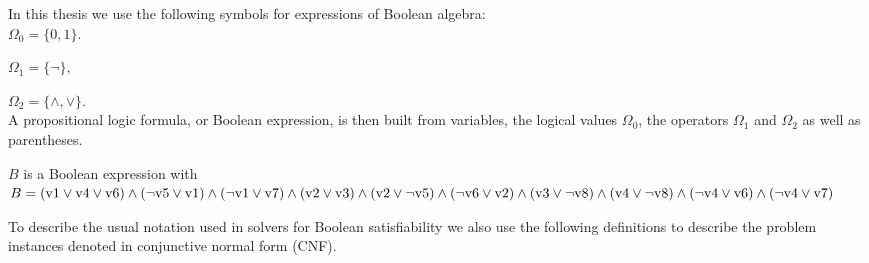\documentclass[a4paper, 12pt, bibliography=totoc]{scrartcl}
\begin{document}
In this thesis we use the following symbols for expressions of Boolean algebra:\\

${ \Omega _{0}=\{0 ,1 \}.}$ 

${\Omega _{1}=\{\lnot \},}$

${ \Omega _{2}= \{\land ,\lor \}.}$\\


A propositional logic formula, or Boolean expression, is then built from variables, the logical values $\Omega _{0}$, the operators $\Omega _{1}$ and $\Omega _{2}$ as well as parentheses.\\


\begin{example}\label{ex:booleanform}
	$B$ is a Boolean expression with\\
	
	$B = (\text{v1}\lor \text{v4}\lor \text{v6})\land (\neg \text{v5}\lor \text{v1})\land (\neg \text{v1}\lor \text{v7})\land (\text{v2}\lor \text{v3})\land (\text{v2}\lor \neg \text{v5})
	\land (\neg \text{v6}\lor \text{v2})\land \\
	(\text{v3}\lor \neg \text{v8})\land (\text{v4}\lor \neg \text{v8})\land (\neg \text{v4}\lor \text{v6})\land (\neg \text{v4}\lor \text{v7})$

\end{example}

To describe the usual notation used in solvers for Boolean satisfiability we also use the following definitions to describe the problem instances denoted in conjunctive normal form (CNF).
\end{document}
